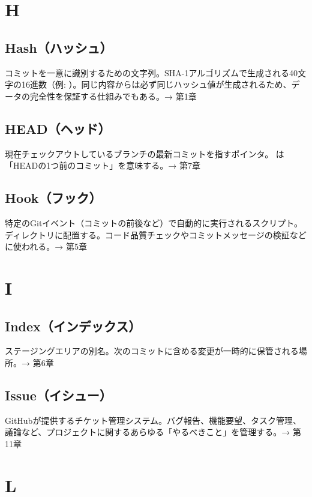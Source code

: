 \section*{H}

\subsection*{Hash（ハッシュ）}
コミットを一意に識別するための文字列。SHA-1アルゴリズムで生成される40文字の16進数（例: ）。同じ内容からは必ず同じハッシュ値が生成されるため、データの完全性を保証する仕組みでもある。→ 第1章

\subsection*{HEAD（ヘッド）}
現在チェックアウトしているブランチの最新コミットを指すポインタ。 は「HEADの1つ前のコミット」を意味する。→ 第7章

\subsection*{Hook（フック）}
特定のGitイベント（コミットの前後など）で自動的に実行されるスクリプト。 ディレクトリに配置する。コード品質チェックやコミットメッセージの検証などに使われる。→ 第5章

\section*{I}

\subsection*{Index（インデックス）}
ステージングエリアの別名。次のコミットに含める変更が一時的に保管される場所。→ 第6章

\subsection*{Issue（イシュー）}
GitHubが提供するチケット管理システム。バグ報告、機能要望、タスク管理、議論など、プロジェクトに関するあらゆる「やるべきこと」を管理する。→ 第11章

\section*{L}

